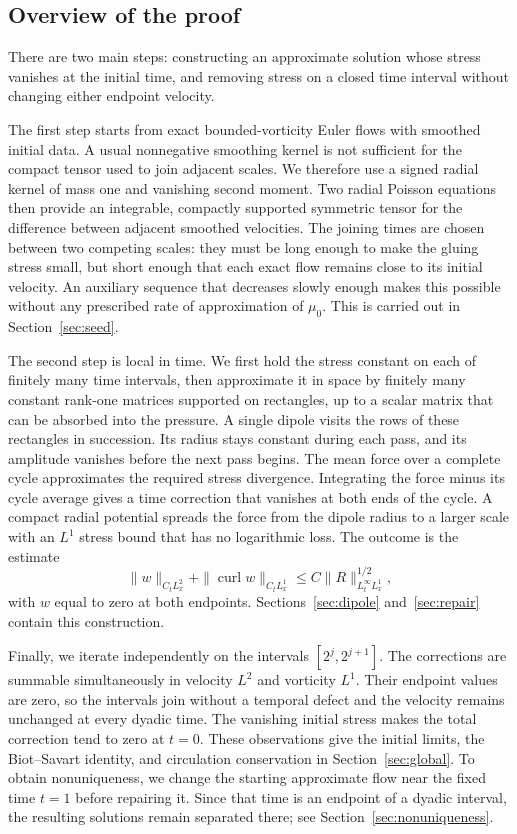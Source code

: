 \documentclass[11pt,a4paper,reqno]{amsart}
\theoremstyle{plain}
\theoremstyle{definition}
\theoremstyle{remark}
\numberwithin{equation}{section}
\newcommand{\curl}{\operatorname{curl}}
\begin{document}
\subsection{Overview of the proof}

There are two main steps: constructing an approximate solution whose
stress vanishes at the initial time, and removing stress on a closed
time interval without changing either endpoint velocity.

The first step starts from exact bounded-vorticity Euler flows with
smoothed initial data. A usual nonnegative smoothing kernel is not
sufficient for the compact tensor used to join adjacent scales. We
therefore use a signed radial kernel of mass one and vanishing second
moment. Two radial Poisson equations then provide an integrable,
compactly supported symmetric tensor for the difference between
adjacent smoothed velocities. The joining times are chosen between
two competing scales: they must be long enough to make the gluing
stress small, but short enough that each exact flow remains close to
its initial velocity. An auxiliary sequence that decreases slowly enough makes this possible
without any prescribed rate of approximation of $\mu_0$. This is
carried out in Section~\ref{sec:seed}.

The second step is local in time. We first hold the stress constant on each of finitely many time
intervals, then approximate it in space by finitely many constant rank-one
matrices supported on rectangles, up to a scalar matrix that can be
absorbed into the pressure. A single dipole visits the rows of these
rectangles in succession. Its radius stays constant during each
pass, and its amplitude vanishes before the next pass begins. The
mean force over a complete cycle approximates the required stress
divergence. Integrating the force minus its cycle average gives a time correction
that vanishes at both ends of the cycle. A compact radial potential spreads the force from the
dipole radius to a larger scale with an $L^1$ stress bound that has
no logarithmic loss. The outcome is the estimate
\[
 \|w\|_{C_tL^2_x}+\|\curl w\|_{C_tL^1_x}
 \le C\|R\|_{L^\infty_tL^1_x}^{1/2},
\]
with $w$ equal to zero at both endpoints. Sections~\ref{sec:dipole}
and~\ref{sec:repair} contain this construction.

Finally, we iterate independently on the intervals $[2^j,2^{j+1}]$.
The corrections are summable simultaneously in velocity $L^2$ and
vorticity $L^1$. Their endpoint values are zero, so the intervals
join without a temporal defect and the velocity remains unchanged at
every dyadic time. The vanishing initial stress makes the total
correction tend to zero at $t=0$. These observations give the initial limits, the Biot--Savart identity,
and circulation conservation in
Section~\ref{sec:global}. To obtain nonuniqueness, we change the starting approximate flow
near the fixed time $t=1$ before repairing it. Since that time is an
endpoint of a dyadic interval, the resulting solutions remain
separated there; see Section~\ref{sec:nonuniqueness}.
\end{document}
